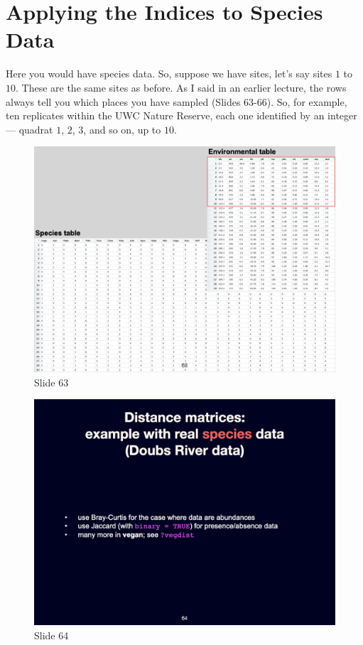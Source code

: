 \documentclass[
  10pt,
]{book}
\begin{document}
\section{Applying the Indices to Species
Data}\label{applying-the-indices-to-species-data}

Here you would have species data. So, suppose we have sites, let's say
sites \(1\) to \(10\). These are the same sites as before. As I said in
an earlier lecture, the rows always tell you which places you have
sampled (Slides 63-66). So, for example, ten replicates within the UWC
Nature Reserve, each one identified by an integer --- quadrat \(1\),
\(2\), \(3\), and so on, up to \(10\).

\begin{figure}[ht]
\centering
\includegraphics[width=0.8\linewidth]{../images/BDC334/BDC334-063.jpeg}
\caption*{Slide 63}
\end{figure}

\begin{figure}[ht]
\centering
\includegraphics[width=0.8\linewidth]{../images/BDC334/BDC334-064.jpeg}
\caption*{Slide 64}
\end{figure}
\end{document}
